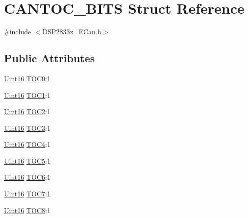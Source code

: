 \hypertarget{struct_c_a_n_t_o_c___b_i_t_s}{}\section{C\+A\+N\+T\+O\+C\+\_\+\+B\+I\+T\+S Struct Reference}
\label{struct_c_a_n_t_o_c___b_i_t_s}


{\ttfamily \#include $<$D\+S\+P2833x\+\_\+\+E\+Can.\+h$>$}

\subsection*{Public Attributes}
\begin{DoxyCompactItemize}
\item 
\hyperlink{_d_s_p2833x___device_8h_a59a9f6be4562c327cbfb4f7e8e18f08b}{Uint16} \hyperlink{struct_c_a_n_t_o_c___b_i_t_s_a0960739a790164ffd3af419daf5a6bdc}{T\+O\+C0}\+:1
\item 
\hyperlink{_d_s_p2833x___device_8h_a59a9f6be4562c327cbfb4f7e8e18f08b}{Uint16} \hyperlink{struct_c_a_n_t_o_c___b_i_t_s_af85a1e53d8a2b8d429bcb21e9dd182f0}{T\+O\+C1}\+:1
\item 
\hyperlink{_d_s_p2833x___device_8h_a59a9f6be4562c327cbfb4f7e8e18f08b}{Uint16} \hyperlink{struct_c_a_n_t_o_c___b_i_t_s_a03edd3cd373971b016fca6458a82b181}{T\+O\+C2}\+:1
\item 
\hyperlink{_d_s_p2833x___device_8h_a59a9f6be4562c327cbfb4f7e8e18f08b}{Uint16} \hyperlink{struct_c_a_n_t_o_c___b_i_t_s_a0c775e52fdd0d33a75d37908ef29f005}{T\+O\+C3}\+:1
\item 
\hyperlink{_d_s_p2833x___device_8h_a59a9f6be4562c327cbfb4f7e8e18f08b}{Uint16} \hyperlink{struct_c_a_n_t_o_c___b_i_t_s_a288c4bd9353db9a56f9a4d2cfd6d5ac4}{T\+O\+C4}\+:1
\item 
\hyperlink{_d_s_p2833x___device_8h_a59a9f6be4562c327cbfb4f7e8e18f08b}{Uint16} \hyperlink{struct_c_a_n_t_o_c___b_i_t_s_ac79cdff95533d2e0d6d41551d77eaa7d}{T\+O\+C5}\+:1
\item 
\hyperlink{_d_s_p2833x___device_8h_a59a9f6be4562c327cbfb4f7e8e18f08b}{Uint16} \hyperlink{struct_c_a_n_t_o_c___b_i_t_s_a6d4939105b8e32d4a32a3e1aa25e0fb2}{T\+O\+C6}\+:1
\item 
\hyperlink{_d_s_p2833x___device_8h_a59a9f6be4562c327cbfb4f7e8e18f08b}{Uint16} \hyperlink{struct_c_a_n_t_o_c___b_i_t_s_ac96c55a3dc2b9b7a2465734b5f113dab}{T\+O\+C7}\+:1
\item 
\hyperlink{_d_s_p2833x___device_8h_a59a9f6be4562c327cbfb4f7e8e18f08b}{Uint16} \hyperlink{struct_c_a_n_t_o_c___b_i_t_s_ac3ff518c54a61ee13564fe624ca31f4c}{T\+O\+C8}\+:1

\end{DoxyCompactItemize}
